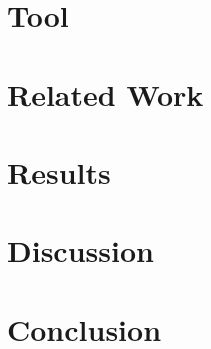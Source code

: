 %


\section{\framework}
\label{sec:framework}


\vspace{-4em}
\section{Tool}
\vspace{-1em}
\label{sec:gui}


%

\section{Related Work}
\label{sec:related}


\section{Results}
\label{sec:results}


\section{Discussion }
\label{sec:discuss}


\section{Conclusion}
\label{sec:conclusion}




